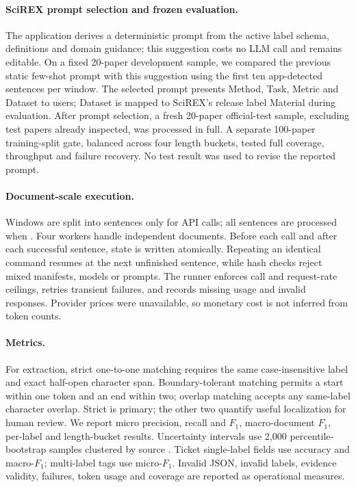 \paragraph{SciREX prompt selection and frozen evaluation.}
The application derives a deterministic prompt from the active label schema,
definitions and domain guidance; this suggestion costs no LLM call and remains
editable. On a fixed 20-paper development sample, we compared the previous
static few-shot prompt with this suggestion using the first ten app-detected
sentences per window. The selected prompt presents Method, Task, Metric and
Dataset to users; Dataset is mapped to SciREX's release label Material during
evaluation. After prompt selection, a fresh 20-paper official-test sample,
excluding test papers already inspected, was processed in full. A separate
100-paper training-split gate, balanced across four length buckets, tested full
coverage, throughput and failure recovery. No test result was used to revise
the reported prompt.

\paragraph{Document-scale execution.}
Windows are split into sentences only for API calls; all sentences are processed
when . Four workers handle independent documents. Before
each call and after each successful sentence, state is written atomically.
Repeating an identical command resumes at the next unfinished sentence, while
hash checks reject mixed manifests, models or prompts. The runner enforces call
and request-rate ceilings, retries transient failures, and records missing usage
and invalid responses. Provider prices were unavailable, so monetary cost is
not inferred from token counts.

\paragraph{Metrics.}
For extraction, strict one-to-one matching requires the same case-insensitive
label and exact half-open character span. Boundary-tolerant matching permits a
start within one token and an end within two; overlap matching accepts any
same-label character overlap. Strict is primary; the other two quantify useful
localization for human review. We report micro precision, recall and $F_1$,
macro-document $F_1$, per-label and length-bucket results. Uncertainty intervals
use 2{,}000 percentile-bootstrap samples clustered by source .
Ticket single-label fields use accuracy and macro-$F_1$; multi-label tags use
micro-$F_1$. Invalid JSON, invalid labels, evidence validity, failures, token
usage and coverage are reported as operational measures.
